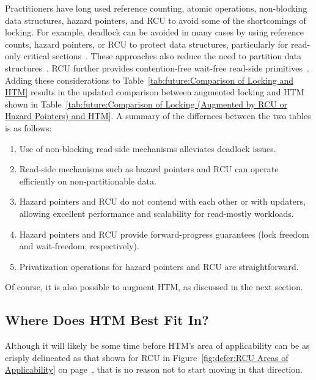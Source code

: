 Practitioners have long used reference counting, atomic operations,
non-blocking data structures, hazard pointers, and RCU to avoid some
of the shortcomings of locking.
For example, deadlock can be avoided in many cases by using reference
counts, hazard pointers, or RCU to protect data structures,
particularly for read-only critical
sections~\cite{MagedMichael04a,HerlihyLM02,MathieuDesnoyers2012URCU,DinakarGuniguntala2008IBMSysJ,ThomasEHart2007a}.
These approaches also reduce the need to partition data
structures~\cite{McKenney2008ParallelProgramming}.
RCU further provides contention-free wait-free read-side
primitives~\cite{MathieuDesnoyers2012URCU}.
Adding these considerations to
Table~\ref{tab:future:Comparison of Locking and HTM}
results in the updated comparison between augmented locking and HTM
shown in
Table~\ref{tab:future:Comparison of Locking (Augmented by RCU or Hazard Pointers) and HTM}.
A summary of the differnces between the two tables is as follows:

\begin{enumerate}
\item	Use of non-blocking read-side mechanisms alleviates deadlock issues.
\item	Read-side mechanisms such as hazard pointers and RCU can operate
	efficiently on non-partitionable data.
\item	Hazard pointers and RCU do not contend with each other or with
	updaters, allowing excellent performance and scalability for
	read-mostly workloads.
\item	Hazard pointers and RCU provide forward-progress guarantees
	(lock freedom and wait-freedom, respectively).
\item	Privatization operations for hazard pointers and RCU are
	straightforward.
\end{enumerate}

Of course, it is also possible to augment HTM,
as discussed in the next section.

\subsection{Where Does HTM Best Fit In?}
\label{sec:future:Where Does HTM Best Fit In?}

Although it will likely be some time before HTM's area of applicability
can be as crisply delineated as that shown for RCU in
Figure~\ref{fig:defer:RCU Areas of Applicability} on
page~\pageref{fig:defer:RCU Areas of Applicability}, that is no reason not to
start moving in that direction.

